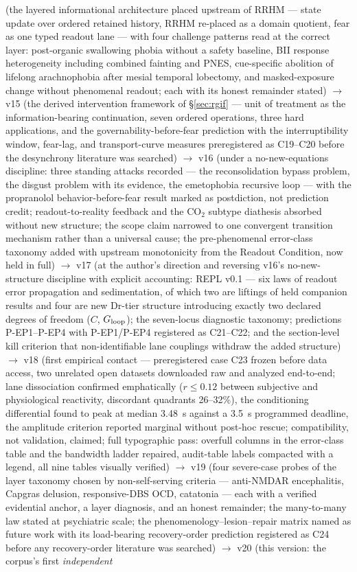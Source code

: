 \documentclass[9pt,twocolumn]{article}
\begin{document}
(the layered informational architecture placed upstream of RRHM --- state update over ordered retained history, RRHM re-placed as a domain quotient, fear as one typed readout lane --- with four challenge patterns read at the correct layer: post-organic swallowing phobia without a safety baseline, BII response heterogeneity including combined fainting and PNES, cue-specific abolition of lifelong arachnophobia after mesial temporal lobectomy, and masked-exposure change without phenomenal readout; each with its honest remainder stated) $\rightarrow$ v15 (the derived intervention framework of \S\ref{sec:rgif} --- unit of treatment as the information-bearing continuation, seven ordered operations, three hard applications, and the governability-before-fear prediction with the interruptibility window, fear-lag, and transport-curve measures preregistered as C19--C20 before the desynchrony literature was searched) $\rightarrow$ v16 (under a no-new-equations discipline: three standing attacks recorded --- the reconsolidation bypass problem, the disgust problem with its evidence, the emetophobia recursive loop --- with the propranolol behavior-before-fear result marked as postdiction, not prediction credit; readout-to-reality feedback and the CO$_2$ subtype diathesis absorbed without new structure; the scope claim narrowed to one convergent transition mechanism rather than a universal cause; the pre-phenomenal error-class taxonomy added with upstream monotonicity from the Readout Condition, now held in full) $\rightarrow$ v17 (at the author's direction and reversing v16's no-new-structure discipline with explicit accounting: REPL v0.1 --- six laws of readout error propagation and sedimentation, of which two are liftings of held companion results and four are new Dr-tier structure introducing exactly two declared degrees of freedom ($C$, $G_{\rm loop}$); the seven-locus diagnostic taxonomy; predictions P-EP1--P-EP4 with P-EP1/P-EP4 registered as C21--C22; and the section-level kill criterion that non-identifiable lane couplings withdraw the added structure) $\rightarrow$ v18 (first empirical contact --- preregistered case C23 frozen before data access, two unrelated open datasets downloaded raw and analyzed end-to-end; lane dissociation confirmed emphatically ($r\le0.12$ between subjective and physiological reactivity, discordant quadrants 26--32\%), the conditioning differential found to peak at median 3.48~s against a 3.5~s programmed deadline, the amplitude criterion reported marginal without post-hoc rescue; compatibility, not validation, claimed; full typographic pass: overfull columns in the error-class table and the bandwidth ladder repaired, audit-table labels compacted with a legend, all nine tables visually verified) $\rightarrow$ v19 (four severe-case probes of the layer taxonomy chosen by non-self-serving criteria --- anti-NMDAR encephalitis, Capgras delusion, responsive-DBS OCD, catatonia --- each with a verified evidential anchor, a layer diagnosis, and an honest remainder; the many-to-many law stated at psychiatric scale; the phenomenology--lesion--repair matrix named as future work with its load-bearing recovery-order prediction registered as C24 before any recovery-order literature was searched) $\rightarrow$ v20 (this version: the corpus's first \emph{independent} 
\end{document}
